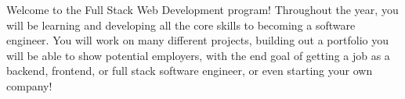 Welcome to the Full Stack Web Development program! Throughout the year, you will be learning and developing all the core skills to becoming
a software engineer. You will work on many different projects, building out a portfolio you will be able to show potential employers, with
the end goal of getting a job as a backend, frontend, or full stack software engineer, or even starting your own company!
